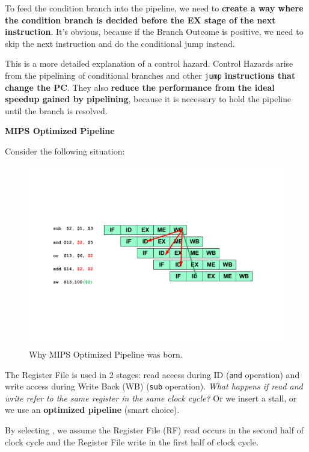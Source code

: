 \highspace
To feed the condition branch into the pipeline, we need to \textbf{create a way where the condition branch is decided before the EX stage of the next instruction}. It's obvious, because if the Branch Outcome is positive, we need to skip the next instruction and do the conditional jump instead.

\highspace
This is a more detailed explanation of a control hazard. Control Hazards arise from the pipelining of conditional branches and other \texttt{jump} \textbf{instructions that change the PC}. They also \textbf{reduce the performance from the ideal speedup gained by pipelining}, because it is necessary to hold the pipeline until the branch is resolved.

\newpage

\begin{center}
    \large
    \textcolor{Red3}{\textbf{MIPS Optimized Pipeline}}
\end{center}
Consider the following situation:
\begin{figure}[!htp]
    \centering
    \includegraphics[width=\textwidth]{img/RAW-hazards-1.pdf}
    \caption{Why MIPS Optimized Pipeline was born.\cite{pipelining-slides}}
\end{figure}

\noindent
The Register File is used in 2 stages: read access during ID (\texttt{and} operation) and write access during Write Back (WB) (\texttt{sub} operation). \emph{What happens if read and write refer to the same register in the same clock cycle?} Or we insert a stall, or we use an \textbf{optimized pipeline} (smart choice).

\begin{definitionbox}
    By selecting , we assume the Register File (RF) read occurs in the second half of clock cycle and the Register File write in the first half of clock cycle.
\end{definitionbox}

